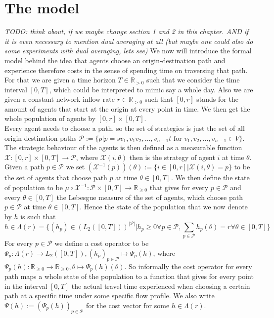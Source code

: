 \documentclass[reqno,openany]{amsbook}
\theoremstyle{definition}
\theoremstyle{plain}
\begin{document}
\section{The model}
\emph{TODO: think about, if we maybe change section 1 and 2 in this chapter. AND if it is even necessary to mention dual averaging at all (but maybe one could also do some experiments with dual averaging, lets see)}
We now will introduce the formal model behind the idea that agents choose an origin-destination path and experience therefore costs in the sense of spending time on traversing that path. For that we are given a time horizon $T \in \mathbb{R}_{>0}$ such that we consider the time interval $[0, T]$, which could be interpreted to mimic say a whole day. Also we are given a constant network inflow rate $r \in \mathbb{R}_{>0}$ such that $[0, r]$ stands for the amount of agents that start at the origin at every point in time. We then get the whole population of agents by $[0, r] \times [0,T]$. \\
Every agent needs to choose a path, so the set of strategies is just the set of all origin-destination-paths $\mathcal{P} := \{p \vert p = sv_1,v_1v_2, \dots, v_{n-1}t \text{  for  } v_1, v_2, \dots, v_{n-1} \in V\}$. \\
The strategic behaviour of the agents is then defined as a measurable function $\mathcal{X}: [0, r] \times [0, T] \to \mathcal{P}$, where $\mathcal{X}(i, \theta)$ then is the strategy of agent $i$ at time $\theta$. Given a path $p \in \mathcal{P}$ we set $(\mathcal{X}^{-1}(p))(\theta) := \{ i \in [0, r] \vert \mathcal{X}(i, \theta) = p \}$ to be the set of agents that choose path $p$ at time $\theta \in [0, T]$. We then define the state of population to be $\mu \circ \mathcal{X}^{-1}: \mathcal{P} \times [0, T] \to \mathbb{R}_{\geq 0 }$ that gives for every $p \in \mathcal{P}$ and every $\theta \in [0, T]$ the Lebesgue measure of the set of agents, which choose path $p \in \mathcal{P}$ at time $\theta \in [0, T]$. Hence the state of the population that we now denote by $h$ is such that 
\[h \in \Lambda(r) = \{ (h_p) \in (L_2([0,T]))^{\lvert \mathcal{P} \rvert} \vert h_p \geq 0 \forall p \in \mathcal{P}, \sum_{p \in \mathcal{P}} h_p(\theta) = r \forall \theta \in [0, T]\} \]
For every $p \in \mathcal{P}$ we define a cost operator to be $\Psi_p: \Lambda(r) \to L_2([0, T]), (h_p)_{p \in \mathcal{P}} \mapsto \Psi_p(h)$, where $\Psi_p(h): \mathbb{R}_{\geq 0} \to \mathbb{R}_{\geq 0}, \theta \mapsto \Psi_p(h)(\theta)$. So informally the cost operator for every path maps a whole state of the population to a function that gives for every point in the interval $[0, T]$ the actual travel time experienced when choosing a certain path at a specific time under some specific flow profile. We also write $\Psi(h) := (\Psi_p(h))_{p \in \mathcal{P}}$ for the cost vector for some $h \in \Lambda(r)$. \\
\end{document}
